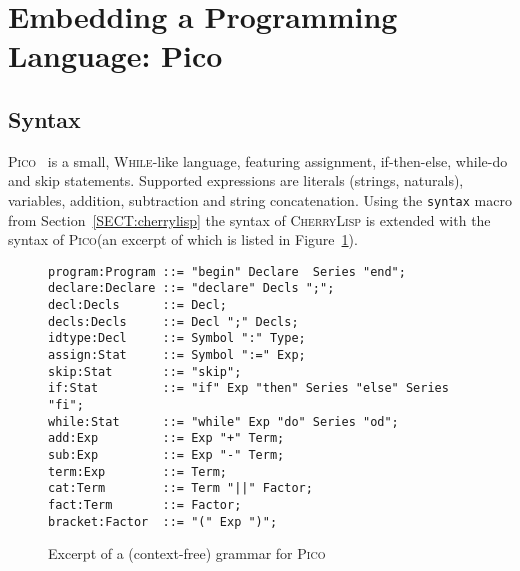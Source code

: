 \documentclass[a4paper]{llncs}
\def\pico{\textsc{Pico}\xspace}
\def\cherrylisp{\textsc{CherryLisp}\xspace}
\begin{document}
\section{Embedding a Programming Language: Pico}
\label{SECT:pico}

\subsection{Syntax}

\pico~\cite{PicoReport} is a small, \textsc{While}-like language,
featuring assignment, if-then-else, while-do and skip
statements. Supported expressions are literals (strings, naturals),
variables, addition, subtraction and string concatenation. Using the
\texttt{syntax} macro from Section~\ref{SECT:cherrylisp} the syntax of
\cherrylisp is extended with the syntax of \pico (an excerpt of which
is listed in Figure~\ref{FIG:pico-syntax}).

\begin{figure}
\begin{center}
\begin{boxedminipage}[t]{0.9\linewidth}
\small
\begin{verbatim}
program:Program ::= "begin" Declare  Series "end";
declare:Declare ::= "declare" Decls ";";
decl:Decls      ::= Decl;
decls:Decls     ::= Decl ";" Decls;
idtype:Decl     ::= Symbol ":" Type;
assign:Stat     ::= Symbol ":=" Exp;
skip:Stat       ::= "skip";
if:Stat         ::= "if" Exp "then" Series "else" Series "fi";
while:Stat      ::= "while" Exp "do" Series "od";
add:Exp         ::= Exp "+" Term;
sub:Exp         ::= Exp "-" Term;
term:Exp        ::= Term;
cat:Term        ::= Term "||" Factor;
fact:Term       ::= Factor;
bracket:Factor  ::= "(" Exp ")";
\end{verbatim}
\end{boxedminipage}
\end{center}
\caption{Excerpt of a (context-free) grammar for \pico\label{FIG:pico-syntax}}
\end{figure}
\end{document}
